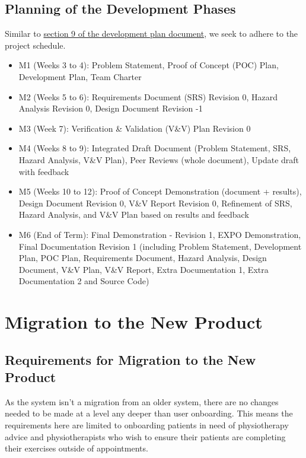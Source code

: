 \documentclass[12pt]{article}
\begin{document}
\subsection{Planning of the Development Phases}

Similar to \href{https://github.com/M9Huynh/technically-functional/blob/main/docs/DevelopmentPlan/DevelopmentPlan.pdf}{section 9 of the development plan document}, we seek to adhere to the project schedule.
 \begin{itemize}
   \item M1 (Weeks 3 to 4): Problem Statement, Proof of Concept (POC) Plan, Development Plan, Team Charter
   \item M2 (Weeks 5 to 6): Requirements Document (SRS) Revision 0, Hazard Analysis Revision 0, Design Document Revision -1
   \item M3 (Week 7): Verification \& Validation (V\&V) Plan Revision 0
   \item M4 (Weeks 8 to 9): Integrated Draft Document (Problem Statement, SRS, Hazard Analysis, V\&V Plan), Peer Reviews (whole document), Update draft with feedback
   \item M5 (Weeks 10 to 12): Proof of Concept Demonstration (document + results), Design Document Revision 0, V\&V Report Revision 0, Refinement of SRS, Hazard Analysis, and V\&V Plan based on results and feedback
   \item M6 (End of Term): Final Demonstration - Revision 1, EXPO Demonstration, Final Documentation Revision 1 (including Problem Statement, Development Plan, POC Plan, Requirements Document, Hazard Analysis, Design Document, V\&V Plan, V\&V Report, Extra Documentation 1, Extra Documentation 2 and Source Code)
 \end{itemize}


\section{Migration to the New Product}
\subsection{Requirements for Migration to the New Product}
As the system isn’t a migration from an older system, there are no changes needed to be made at a level any deeper than user onboarding. This means the requirements here are limited to onboarding patients in need of physiotherapy advice and physiotherapists who wish to ensure their patients are completing their exercises outside of appointments.
\end{document}
